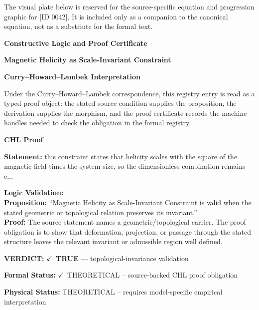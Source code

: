 \begingroup\footnotesize\sloppy
The visual plate below is reserved for the source-specific equation and progression graphic for [ID 0042]. It is included only as a companion to the canonical equation, not as a substitute for the formal text.
\par\endgroup
\ifTZPDarkEdition
{}
\fi

\clearpage
\begingroup\tzpsupportsetup
\noindent\textbf{\fontsize{10.8pt}{12.8pt}\selectfont [ID 0042] Constructive Logic and Proof Certificate}\par
\noindent\textbf{\fontsize{10pt}{12pt}\selectfont Magnetic Helicity as Scale-Invariant Constraint}\par
\vspace{0.45em}
\begingroup
\footnotesize
\setlength{\parskip}{0.22em}
\setlength{\parindent}{0pt}
\noindent\textbf{Curry--Howard--Lambek Interpretation}\par
Under the Curry--Howard--Lambek correspondence, this registry entry is read as a typed proof
object: the stated source condition supplies the proposition, the derivation supplies the
morphism, and the proof certificate records the machine handles needed to check the obligation
in the formal registry.

\vspace{0.45em}
\noindent\textbf{CHL Proof}\par
\textbf{Statement:} this constraint states that helicity scales with the square of the magnetic field times
the system size, so the dimensionless combination remains c...

\textbf{Logic Validation:}\\
\textbf{Proposition:} ``Magnetic Helicity as Scale-Invariant Constraint is valid when the stated geometric or
topological relation preserves its invariant.''\\
\textbf{Proof:} The source statement names a geometric/topological carrier. The proof obligation is to
show that deformation, projection, or passage through the stated structure leaves the
relevant invariant or admissible region well defined.

\textbf{VERDICT:} \ensuremath{\checkmark}\ \textbf{TRUE} --- topological-invariance validation

\textbf{Formal Status:} \ensuremath{\checkmark}\ THEORETICAL -- source-backed CHL proof obligation

\textbf{Physical Status:} THEORETICAL -- requires model-specific empirical interpretation
\par\vspace{0.45em}
\par
\ifTZPDarkEdition
{}
\fi
\endgroup
\endgroup
